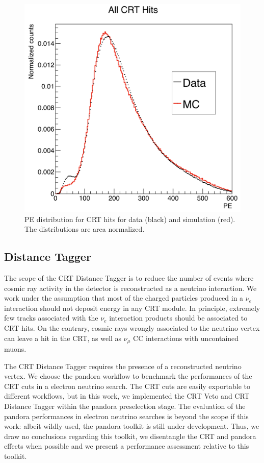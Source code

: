 \begin{figure}[h!]
\centering
\includegraphics[scale=0.35]{images/CRTPENoCut}
\caption{PE distribution for CRT hits for data (black) and simulation (red). The distributions are area normalized.}
\label{fig:CRTPe}
\end{figure}



\subsection{Distance Tagger}\label{sec:DistCuts}
The scope of the CRT Distance Tagger is to reduce the number of events where cosmic ray activity in the detector is reconstructed as a neutrino interaction. We work under the assumption that most of the charged particles produced in a $\nu_e$ interaction should not deposit energy in any CRT module. 
In principle, extremely few tracks associated with the $\nu_e$ interaction products should be associated to CRT hits. On the contrary, cosmic rays wrongly associated to the neutrino vertex can leave a hit in the CRT, as well as  $\nu_\mu$ CC interactions with uncontained  muons.

The CRT Distance Tagger requires the presence of a reconstructed neutrino vertex.  We choose the pandora workflow to benchmark the performances of the CRT cuts in a electron neutrino search. The CRT cuts are easily exportable to different workflows, but in this work, we implemented the CRT Veto and CRT Distance Tagger within the pandora preselection stage. The evaluation of the pandora performances in electron neutrino searches is beyond the scope if this work: albeit wildly used, the pandora toolkit is still under development. Thus, we draw no conclusions regarding this toolkit, we disentangle the CRT  and pandora effects when possible and we present a performance assessment relative to this toolkit.\\

